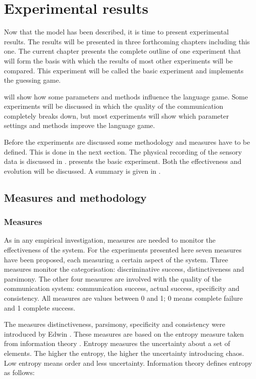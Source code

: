 \chapter{Experimental results}\label{ch:basic}

Now that the model has been described, it is time to present
experimental results. The results will be presented in three
forthcoming chapters including this one. The current chapter presents the complete outline of one experiment that will form the basis with which
the results of most other experiments will be compared. This experiment will be called the basic experiment and implements the guessing game.

 will show how some parameters and methods
influence the language game. Some experiments will be discussed
in which the quality of the communication completely breaks
down, but most experiments will show which parameter settings
and methods improve the language game.

Before the experiments are discussed some methodology and measures have
to be defined. This is done in the next section. The physical
recording of the sensory data is discussed in .  presents the
basic experiment. Both the effectiveness and evolution will be
discussed. A summary is given in .

\section{Measures and methodology}\label{s:st:measures}
\subsection{Measures}

As in any empirical investigation, measures are needed to
monitor the effectiveness of the system. For the experiments
presented here seven measures have been proposed, each measuring
a certain aspect of the system. Three measures monitor the categorisation: {\sc discriminative success}, {\sc
distinctiveness} and {\sc parsimony}. The other four measures
are involved with the quality of the communication system: {\sc
communication success}, {\sc actual success}, {\sc
specificity} and {\sc consistency}. All measures are values between 0 and 1; 0 means complete failure and 1 complete success.

The measures distinctiveness, parsimony, specificity and consistency were introduced by Edwin \citet{dejong:2000}. These measures are based on the entropy measure taken from information theory \citep{shannon:1948}. Entropy measures the uncertainty about a set of elements. The higher the entropy, the higher the uncertainty introducing chaos. Low entropy means order and less uncertainty. Information theory defines entropy as follows:%

